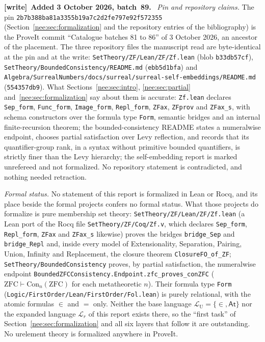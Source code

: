 \documentclass[11pt,letterpaper]{article}
\numberwithin{equation}{section}
\theoremstyle{plain}
\theoremstyle{definition}
\theoremstyle{remark}
\newcommand{\At}{\mathsf{At}}
\newcommand{\Lang}{\mathcal L_{\mathrm U}}
\newcommand{\Langr}{\mathcal L_r}
\newenvironment{writenote}[1][]{\par\smallskip\begingroup\small\raggedright
 \setlength{\parindent}{1.25em}\noindent\textbf{[write]}\if\relax\detokenize{#1}\relax\else~\textbf{#1.}\fi\ }%
 {\par\endgroup\smallskip}
\begin{document}
\begin{writenote}[Added 3 October 2026, batch~89]
\emph{Pin and repository claims.} The pin \texttt{2b7b388ba81a3355b19a7c2d2fe797e92f572355} (Section~\ref{nee:sec:formalization} and the repository entries of the bibliography) is the ProveIt commit ``Catalogue batches 81 to 86'' of 3 October 2026, an ancestor of the placement. The three repository files the manuscript read are byte-identical at the pin and at the write: \nolinkurl{SetTheory/ZF/Lean/ZF/Zf.lean} (blob \texttt{b33db57cf}), \nolinkurl{SetTheory/BoundedConsistency/README.md} (\texttt{ebb5d1bfa}) and \nolinkurl{Algebra/SurrealNumbers/docs/surreal/surreal-self-embeddings/README.md} (\texttt{554357db9}). What Sections~\ref{nee:sec:intro}, \ref{nee:sec:partial} and~\ref{nee:sec:formalization} say about them is accurate: \texttt{Zf.lean} declares \texttt{Sep\_form}, \texttt{Func\_form}, \texttt{Image\_form}, \texttt{Repl\_form}, \texttt{ZFax}, \texttt{ZFprov} and \texttt{ZFax\_s}, with schema constructors over the formula type \texttt{Form}, semantic bridges and an internal finite-recursion theorem; the bounded-consistency README states a numeralwise endpoint, chooses partial satisfaction over Levy reflection, and records that its quantifier-group rank, in a syntax without primitive bounded quantifiers, is strictly finer than the Levy hierarchy; the self-embedding report is marked unrefereed and not formalized. No repository statement is contradicted, and nothing needed retraction.

\emph{Formal status.} No statement of this report is formalized in Lean or Rocq, and its place beside the formal projects confers no formal status. What those projects do formalize is pure membership set theory: \nolinkurl{SetTheory/ZF/Lean/ZF/Zf.lean} (a Lean port of the Rocq file \nolinkurl{SetTheory/ZF/Coq/Zf.v}, which declares \texttt{Sep\_form}, \texttt{Repl\_form}, \texttt{ZFax} and \texttt{ZFax\_s} likewise) proves the bridges \texttt{bridge\_Sep} and \texttt{bridge\_Repl} and, inside every model of Extensionality, Separation, Pairing, Union, Infinity and Replacement, the closure theorem \texttt{ClosureFO\_of\_ZF}; \nolinkurl{SetTheory/BoundedConsistency} proves, by partial satisfaction, the numeralwise endpoint \texttt{BoundedZFCConsistency.Endpoint.zfc\_proves\_conZFC} ($\mathrm{ZFC}\vdash\mathrm{Con}_n(\mathrm{ZFC})$ for each metatheoretic $n$). Their formula type \texttt{Form} (\nolinkurl{Logic/FirstOrder/Lean/FirstOrder/Fol.lean}) is purely relational, with the atomic formulas $\in$ and $=$ only. Neither the base language $\Lang=\{\in,\At\}$ nor the expanded language $\Langr$ of this report exists there, so the ``first task'' of Section~\ref{nee:sec:formalization} and all six layers that follow it are outstanding. No urelement theory is formalized anywhere in ProveIt.


\end{writenote}
\end{document}
